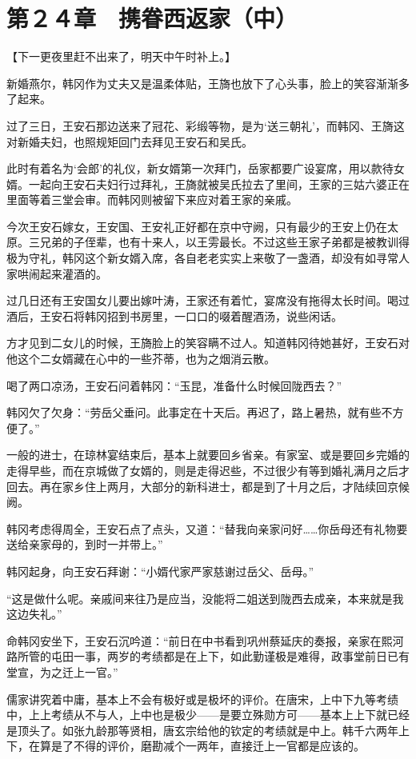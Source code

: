 \section{第２４章　携眷西返家（中）}

【下一更夜里赶不出来了，明天中午时补上。】

新婚燕尔，韩冈作为丈夫又是温柔体贴，王旖也放下了心头事，脸上的笑容渐渐多了起来。

过了三日，王安石那边送来了冠花、彩缎等物，是为‘送三朝礼’，而韩冈、王旖这对新婚夫妇，也照规矩回门去拜见王安石和吴氏。

此时有着名为‘会郎’的礼仪，新女婿第一次拜门，岳家都要广设宴席，用以款待女婿。一起向王安石夫妇行过拜礼，王旖就被吴氏拉去了里间，王家的三姑六婆正在里面等着三堂会审。而韩冈则被留下来应对着王家的亲戚。

今次王安石嫁女，王安国、王安礼正好都在京中守阙，只有最少的王安上仍在太原。三兄弟的子侄辈，也有十来人，以王雱最长。不过这些王家子弟都是被教训得极为守礼，韩冈这个新女婿入席，各自老老实实上来敬了一盏酒，却没有如寻常人家哄闹起来灌酒的。

过几日还有王安国女儿要出嫁叶涛，王家还有着忙，宴席没有拖得太长时间。喝过酒后，王安石将韩冈招到书房里，一口口的啜着醒酒汤，说些闲话。

方才见到二女儿的时候，王旖脸上的笑容瞒不过人。知道韩冈待她甚好，王安石对他这个二女婿藏在心中的一些芥蒂，也为之烟消云散。

喝了两口凉汤，王安石问着韩冈：“玉昆，准备什么时候回陇西去？”

韩冈欠了欠身：“劳岳父垂问。此事定在十天后。再迟了，路上暑热，就有些不方便了。”

一般的进士，在琼林宴结束后，基本上就要回乡省亲。有家室、或是要回乡完婚的走得早些，而在京城做了女婿的，则是走得迟些，不过很少有等到婚礼满月之后才回去。再在家乡住上两月，大部分的新科进士，都是到了十月之后，才陆续回京候阙。

韩冈考虑得周全，王安石点了点头，又道：“替我向亲家问好……你岳母还有礼物要送给亲家母的，到时一并带上。”

韩冈起身，向王安石拜谢：“小婿代家严家慈谢过岳父、岳母。”

“这是做什么呢。亲戚间来往乃是应当，没能将二姐送到陇西去成亲，本来就是我这边失礼。”

命韩冈安坐下，王安石沉吟道：“前日在中书看到巩州蔡延庆的奏报，亲家在熙河路所管的屯田一事，两岁的考绩都是在上下，如此勤谨极是难得，政事堂前日已有堂宣，为之迁上一官。”

儒家讲究着中庸，基本上不会有极好或是极坏的评价。在唐宋，上中下九等考绩中，上上考绩从不与人，上中也是极少——是要立殊勋方可——基本上上下就已经是顶头了。如张九龄那等贤相，唐玄宗给他的钦定的考绩就是中上。韩千六两年上下，在算是了不得的评价，磨勘减个一两年，直接迁上一官都是应该的。

